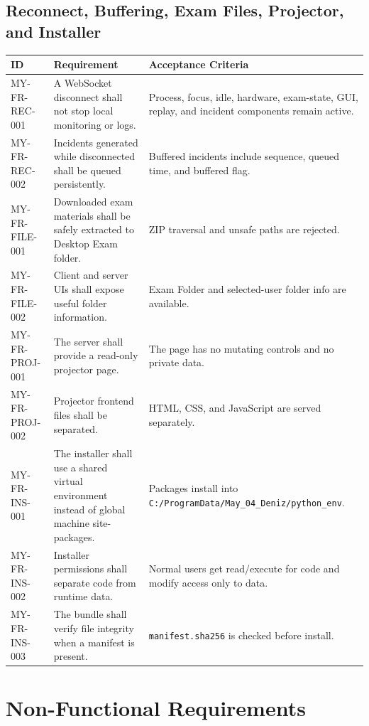 \documentclass[12pt,a4paper]{article}
\begin{document}
\subsection{Reconnect, Buffering, Exam Files, Projector, and Installer}

\begin{longtable}{L{0.18\textwidth} L{0.47\textwidth} L{0.25\textwidth}}
\textbf{ID} & \textbf{Requirement} & \textbf{Acceptance Criteria} \\
\hline
MY-FR-REC-001 & A WebSocket disconnect shall not stop local monitoring or logs. & Process, focus, idle, hardware, exam-state, GUI, replay, and incident components remain active. \\
MY-FR-REC-002 & Incidents generated while disconnected shall be queued persistently. & Buffered incidents include sequence, queued time, and buffered flag. \\
MY-FR-FILE-001 & Downloaded exam materials shall be safely extracted to Desktop Exam folder. & ZIP traversal and unsafe paths are rejected. \\
MY-FR-FILE-002 & Client and server UIs shall expose useful folder information. & Exam Folder and selected-user folder info are available. \\
MY-FR-PROJ-001 & The server shall provide a read-only projector page. & The page has no mutating controls and no private data. \\
MY-FR-PROJ-002 & Projector frontend files shall be separated. & HTML, CSS, and JavaScript are served separately. \\
MY-FR-INS-001 & The installer shall use a shared virtual environment instead of global machine site-packages. & Packages install into \texttt{C:/ProgramData/May\_04\_Deniz/python\_env}. \\
MY-FR-INS-002 & Installer permissions shall separate code from runtime data. & Normal users get read/execute for code and modify access only to data. \\
MY-FR-INS-003 & The bundle shall verify file integrity when a manifest is present. & \texttt{manifest.sha256} is checked before install. \\
\end{longtable}

\section{Non-Functional Requirements}
\end{document}
